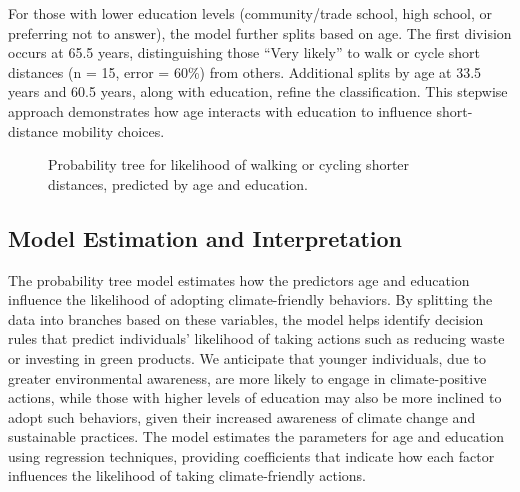\documentclass[
  letterpaper,
  DIV=11,
  numbers=noendperiod]{scrartcl}
\begin{document}
For those with lower education levels (community/trade school, high
school, or preferring not to answer), the model further splits based on
age. The first division occurs at 65.5 years, distinguishing those
``Very likely'' to walk or cycle short distances (n = 15, error = 60\%)
from others. Additional splits by age at 33.5 years and 60.5 years,
along with education, refine the classification. This stepwise approach
demonstrates how age interacts with education to influence
short-distance mobility choices.

\begin{figure}


\caption{\label{fig-eighteen}Probability tree for likelihood of walking
or cycling shorter distances, predicted by age and education.}

\end{figure}%

\subsection{Model Estimation and
Interpretation}\label{model-estimation-and-interpretation}

The probability tree model estimates how the predictors age and
education influence the likelihood of adopting climate-friendly
behaviors. By splitting the data into branches based on these variables,
the model helps identify decision rules that predict individuals'
likelihood of taking actions such as reducing waste or investing in
green products. We anticipate that younger individuals, due to greater
environmental awareness, are more likely to engage in climate-positive
actions, while those with higher levels of education may also be more
inclined to adopt such behaviors, given their increased awareness of
climate change and sustainable practices. The model estimates the
parameters for age and education using regression techniques, providing
coefficients that indicate how each factor influences the likelihood of
taking climate-friendly actions.
\end{document}
